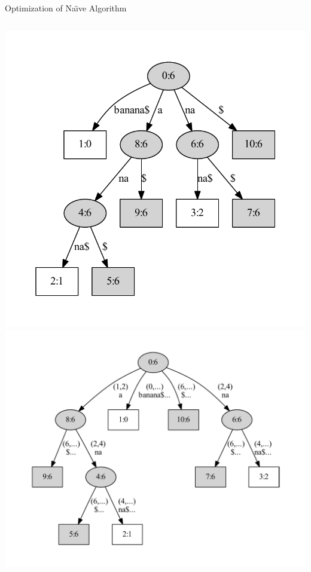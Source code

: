 \begin{frame}[shrink=5]{Optimization of Na\"{\i}ve Algorithm}
\begin{columns}
\includegraphics[width=\textwidth,trim=40pt 40pt 40pt 40pt]{banana-st.pdf}
{\huge \MVRightarrow}
\includegraphics[width=\textwidth,trim=50pt 50pt 50pt 50pt]{banana_.pdf}
\end{columns}
\end{frame}


